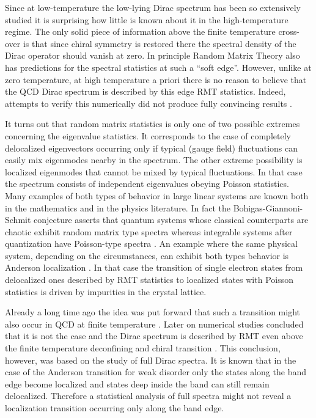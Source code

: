 \documentclass[twocolumn, prd, preprintnumbers, amsmath,
  amssymb, showpacs, floatfix]{revtex4-1}
\begin{document}
Since at low-temperature the low-lying Dirac spectrum has been so extensively
studied it is surprising how little is known about it in the high-temperature
regime. The only solid piece of information above the finite temperature
cross-over is that since chiral symmetry is restored there the spectral
density of the Dirac operator should vanish at zero. In principle Random
Matrix Theory also has predictions for the spectral statistics at such a
``soft edge''. However, unlike at zero temperature, at high temperature a
priori there is no reason to believe that the QCD Dirac spectrum is described
by this edge RMT statistics. Indeed, attempts to verify this numerically did
not produce fully convincing results \cite{Farchioni:1999ws,Damgaard:2000cx}.

It turns out that random matrix statistics is only one of two possible
extremes concerning the eigenvalue statistics. It corresponds to the case of
completely delocalized eigenvectors occurring only if typical (gauge field)
fluctuations can easily mix eigenmodes nearby in the spectrum. The other
extreme possibility is localized eigenmodes that cannot be mixed by typical
fluctuations. In that case the spectrum consists of independent eigenvalues
obeying Poisson statistics. Many examples of both types of behavior in large
linear systems are known both in the mathematics and in the physics
literature. In fact the Bohigas-Giannoni-Schmit conjecture asserts that
quantum systems whose classical counterparts are chaotic exhibit random matrix
type spectra whereas integrable systems after quantization have Poisson-type
spectra \cite{Bohigas:1983er}. An example where the same physical system,
depending on the circumstances, can exhibit both types behavior is Anderson
localization \cite{Anderson:1958vr}. In that case the transition of single
electron states from delocalized ones described by RMT statistics to localized
states with Poisson statistics is driven by impurities in the crystal lattice.

Already a long time ago the idea was put forward that such a transition might
also occur in QCD at finite temperature \cite{Halasz:1995vd}. Later on
numerical studies concluded that it is not the case and the Dirac spectrum is
described by RMT even above the finite temperature deconfining and chiral
transition \cite{Pullirsch:1998ke}. This conclusion, however, was based on the
study of full Dirac spectra. It is known that in the case of the Anderson
transition for weak disorder only the states along the band edge become
localized and states deep inside the band can still remain
delocalized. Therefore a statistical analysis of full spectra might not reveal
a localization transition occurring only along the band edge.
\end{document}
